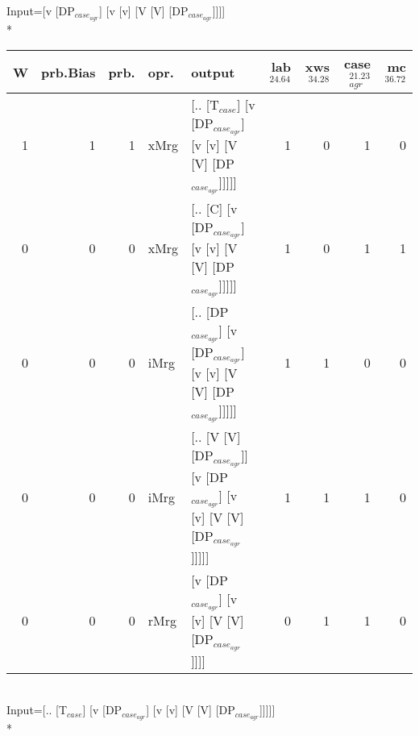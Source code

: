 \begingroup\scriptsize Input=[v [DP$_{case_{agr}}$] [v [v] [V [V] [DP$_{case_{agr}}$]]]]\\*
\begin{tabularx}{\linewidth}{rrrlXrrrr}
\hline
   W &   prb.Bias &   prb. & opr.   & output                                                                     &   lab$^{24.64}$ &   xws$^{34.28}$ &   case$_{agr}^{21.23}$ &   mc$^{36.72}$ \\
\hline
   1 &       1 &   1 & xMrg & [.. [T$_{case}$] [v [DP$_{case_{agr}}$] [v [v] [V [V] [DP$_{case_{agr}}$]]]]]              &             1 &             0 &                  1 &            0 \\
   0 &       0 &   0 & xMrg & [.. [C] [v [DP$_{case_{agr}}$] [v [v] [V [V] [DP$_{case_{agr}}$]]]]]                   &             1 &             0 &                  1 &            1 \\
   0 &       0 &   0 & iMrg & [.. [DP$_{case_{agr}}$] [v [DP$_{case_{agr}}$] [v [v] [V [V] [DP$_{case_{agr}}$]]]]]         &             1 &             1 &                  0 &            0 \\
   0 &       0 &   0 & iMrg & [.. [V [V] [DP$_{case_{agr}}$]] [v [DP$_{case_{agr}}$] [v [v] [V [V] [DP$_{case_{agr}}$]]]]] &             1 &             1 &                  1 &            0 \\
   0 &       0 &   0 & rMrg & [v [DP$_{case_{agr}}$] [v [v] [V [V] [DP$_{case_{agr}}$]]]]                            &             0 &             1 &                  1 &            0 \\
\hline
\end{tabularx}\endgroup\\
\begingroup\scriptsize Input=[.. [T$_{case}$] [v [DP$_{case_{agr}}$] [v [v] [V [V] [DP$_{case_{agr}}$]]]]]\\*
